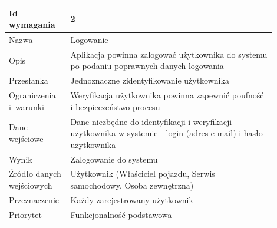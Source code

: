 \documentclass[12pt]{article}
\begin{document}
\begin{table}[H]
\begin{center}
\end{center}
	\begin{tabular}{|p{0.18\linewidth}|p{0.72\linewidth}|}%
	\hline
	Id wymagania 	& 2 				\\ \hline
	Nazwa			& Logowanie \\ \hline
	Opis & Aplikacja powinna zalogować użytkownika do systemu po
podaniu poprawnych danych logowania
\\ \hline
	Przesłanka & Jednoznaczne zidentyfikowanie użytkownika  \\ \hline
	Ograniczenia i~warunki & Weryfikacja użytkownika powinna zapewnić poufność i bezpieczeństwo procesu  \\ \hline
	Dane wejściowe & Dane niezbędne do identyfikacji i weryfikacji użytkownika
w systemie - login (adres e-mail) i hasło użytkownika
  \\ \hline
	Wynik & Zalogowanie do systemu \\ \hline
	Źródło danych wejściowych & Użytkownik (Właściciel pojazdu, Serwis samochodowy, Osoba zewnętrzna) \\ \hline
	Przeznaczenie & Każdy zarejestrowany użytkownik \\ \hline
	Priorytet & Funkcjonalność podstawowa \\ \hline
	\end{tabular}

\end{table}
\end{document}
